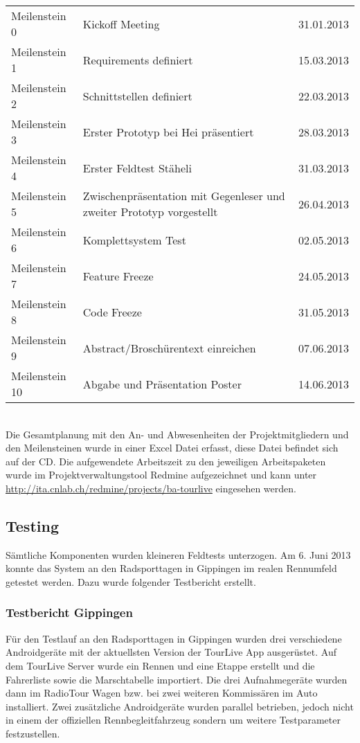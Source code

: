 \begin{tabular}{p{2.8cm}p{7.5cm}r}
Meilenstein 0 & Kickoff Meeting & 31.01.2013\\
Meilenstein 1 & Requirements definiert & 15.03.2013\\
Meilenstein 2 & Schnittstellen definiert & 22.03.2013\\
Meilenstein 3 & Erster Prototyp bei Hei präsentiert & 28.03.2013\\
Meilenstein 4 & Erster Feldtest Stäheli & 31.03.2013\\
Meilenstein 5 & Zwischenpräsentation mit Gegenleser und zweiter Prototyp vorgestellt & 26.04.2013\\
Meilenstein 6 & Komplettsystem Test & 02.05.2013\\
Meilenstein 7 & Feature Freeze & 24.05.2013\\
Meilenstein 8 & Code Freeze & 31.05.2013\\
Meilenstein 9 & Abstract/Broschürentext einreichen & 07.06.2013\\
Meilenstein 10 & Abgabe und Präsentation Poster & 14.06.2013\\
\end{tabular}
\\

Die Gesamtplanung mit den An- und Abwesenheiten der Projektmitgliedern und den Meilensteinen wurde in einer Excel Datei erfasst, diese Datei befindet sich auf der CD. Die aufgewendete Arbeitszeit zu den jeweiligen Arbeitspaketen wurde im Projektverwaltungstool Redmine aufgezeichnet und kann unter \url{http://ita.cnlab.ch/redmine/projects/ba-tourlive} eingesehen werden.
\\

\subsection{Testing}
Sämtliche Komponenten wurden kleineren Feldtests unterzogen. Am 6. Juni 2013 konnte das System an den Radsporttagen in Gippingen im realen Rennumfeld getestet werden. Dazu wurde folgender Testbericht erstellt.

\subsubsection{Testbericht Gippingen}
Für den Testlauf an den Radsporttagen in Gippingen wurden drei verschiedene Androidgeräte mit der aktuellsten Version der TourLive App ausgerüstet. Auf dem TourLive Server wurde ein Rennen und eine Etappe erstellt und die Fahrerliste sowie die Marschtabelle importiert. Die drei Aufnahmegeräte wurden dann im RadioTour Wagen bzw. bei zwei weiteren Kommissären im Auto installiert. Zwei zusätzliche Androidgeräte wurden parallel betrieben, jedoch nicht in einem der offiziellen Rennbegleitfahrzeug sondern um weitere Testparameter festzustellen.
\\

